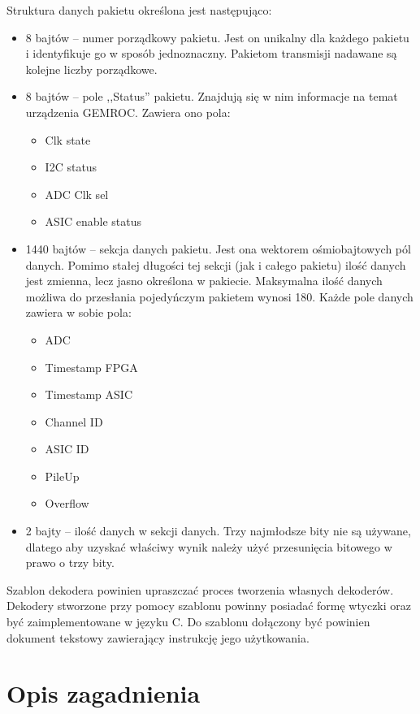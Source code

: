 \documentclass[a4paper, 11pt, twoside, openright]{article}
\begin{document}
	Struktura danych pakietu określona jest następująco:
	\begin{itemize}
		\item 8 bajtów -- numer porządkowy pakietu. Jest on unikalny dla każdego pakietu i identyfikuje go w sposób jednoznaczny.
			Pakietom transmisji nadawane są kolejne liczby porządkowe.
		\item 8 bajtów -- pole ,,Status'' pakietu. Znajdują się w nim informacje na temat urządzenia GEMROC. Zawiera ono pola:
			\begin{itemize}
				\item Clk state
				\item I2C status
				\item ADC Clk sel
				\item ASIC enable status
			\end{itemize}
		\item 1440 bajtów -- sekcja danych pakietu. Jest ona wektorem ośmiobajtowych pól danych. Pomimo stałej długości tej sekcji
			(jak i całego pakietu) ilość danych jest zmienna, lecz jasno określona w pakiecie. Maksymalna ilość danych możliwa do przesłania
			pojedyńczym pakietem wynosi 180. Każde pole danych zawiera w sobie pola:
			\begin{itemize}
				\item ADC
				\item Timestamp FPGA
				\item Timestamp ASIC
				\item Channel ID
				\item ASIC ID
				\item PileUp
				\item Overflow
			\end{itemize}
		\item 2 bajty -- ilość danych w sekcji danych. Trzy najmłodsze bity nie są używane, dlatego aby uzyskać właściwy wynik
			należy użyć przesunięcia bitowego w prawo o trzy bity.
	\end{itemize}

	Szablon dekodera powinien upraszczać proces tworzenia własnych dekoderów. Dekodery stworzone przy pomocy szablonu powinny posiadać
	formę wtyczki oraz być zaimplementowane w języku C. Do szablonu dołączony być powinien dokument tekstowy zawierający instrukcję
	jego użytkowania.


\cleardoublepage
\section{Opis zagadnienia}
\end{document}
